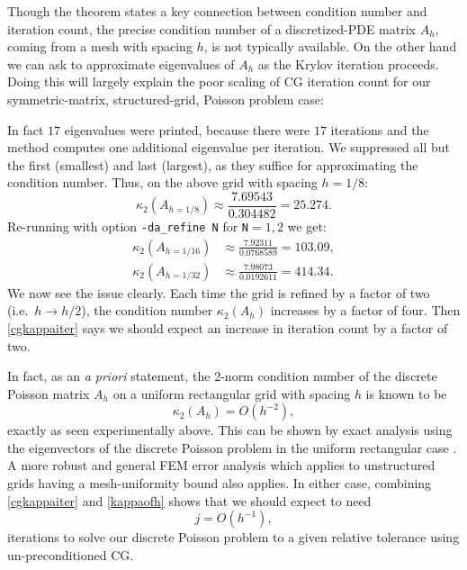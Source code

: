 Though the theorem states a key connection between condition number and iteration count, the precise condition number of a discretized-PDE matrix $A_h$, coming from a mesh with spacing $h$, is not typically available.  On the other hand we can ask \PETSc to approximate eigenvalues of $A_h$ as the Krylov iteration proceeds.  Doing this will largely explain the poor scaling of CG iteration count for our symmetric-matrix, structured-grid, Poisson problem case:
In fact $17$ eigenvalues were printed, because there were $17$ \pKSP iterations and the method computes one additional eigenvalue per iteration.  We suppressed all but the first (smallest) and last (largest), as they suffice for approximating the condition number.  Thus, on the above grid with spacing $h=1/8$:
    $$\kappa_2(A_{h=1/8}) \approx \frac{7.69543}{0.304482} = 25.274.$$
Re-running with option \texttt{-da\_refine N} for \texttt{N}$=1,2$ we get:
\begin{align*}
    \kappa_2(A_{h=1/16}) &\approx \frac{7.92311}{0.0768589} = 103.09, \\
    \kappa_2(A_{h=1/32}) &\approx \frac{7.98073}{0.0192611} = 414.34.
\end{align*}
We now see the issue clearly.  Each time the grid is refined by a factor of two (i.e.~$h\to h/2$), the condition number $\kappa_2(A_h)$ increases by a factor of four.  Then \eqref{cgkappaiter} says we should expect an increase in iteration count by a factor of two.

In fact, as an \emph{a priori} statement, the $2$-norm condition number of the discrete Poisson matrix $A_h$ on a uniform rectangular grid with spacing $h$ is known to be
\begin{equation}
    \kappa_2(A_h) = O(h^{-2}), \label{kappaofh}
\end{equation}
exactly as seen experimentally above.  This can be shown by exact analysis using the eigenvectors of the discrete Poisson problem in the uniform rectangular case \citep{Briggsetal2000}.  A more robust and general FEM error analysis which applies to unstructured grids having a mesh-uniformity bound \citep{Elmanetal2005} also applies.  In either case, combining \eqref{cgkappaiter} and \eqref{kappaofh} shows that we should expect to need
\begin{equation}
    j = O(h^{-1}), \label{kofh}
\end{equation}
iterations to solve our discrete Poisson problem to a given relative tolerance using un-preconditioned CG.

